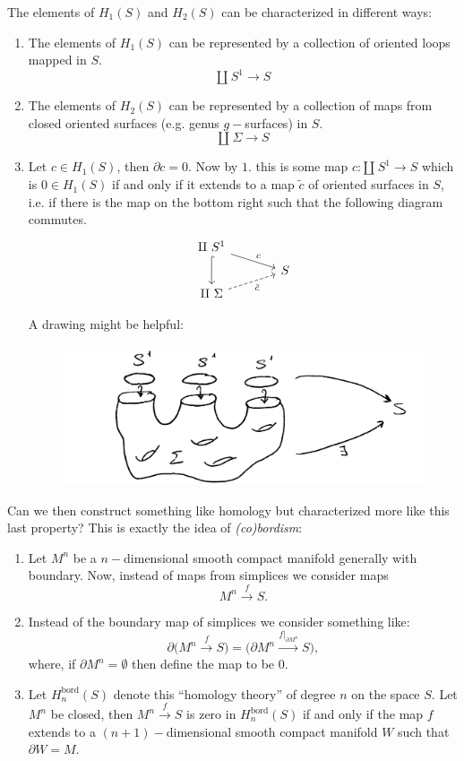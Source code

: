 The elements of $H_1(S)$ and $H_2(S)$ can be characterized in different ways:
\begin{enumerate}
    \item The elements of $H_1(S)$ can be represented by a collection of oriented loops mapped in $S$.
    $$\amalg \ S^1\longrightarrow S$$
    \item The elements of $H_2(S)$ can be represented by a collection of maps from closed oriented surfaces (e.g. genus $g-$surfaces) in $S$.
    $$\amalg \ \Sigma\longrightarrow S$$
    \item Let $c\in H_1(S)$, then $\partial c=0$. Now by $1.$ this is some map $c: \amalg \ S^1\to S$ which is $0 \in H_1(S)$ if and only if it extends to a map $\tilde c$ of oriented surfaces in $S$, i.e. if there is the map on the bottom right such that the following diagram commutes.
    $$
    \begin{tikzcd}[row sep=tiny, column sep=small]
      \amalg \ S^1 \ar[drrr, "c"] \ar[dd, hook]\\
                  &&&S \\
      \amalg \ \Sigma \ar[urrr, dashrightarrow, "\tilde c"']
    \end{tikzcd}
    $$
    
    A drawing might be helpful:
    \begin{figure}[!ht]
    \centering
    \includegraphics[width=11cm]{images/Lecture 1/extension.png}
    \end{figure}
\end{enumerate}
Can we then construct something like homology but characterized more like this last property?
This is exactly the idea of \textit{(co)bordism}:
\begin{enumerate}
    \item Let $M^n$ be a $n-$dimensional smooth compact manifold generally with boundary. Now, instead of maps from simplices we consider maps
    $$M^n\xrightarrow{f} S.$$
    \item Instead of the boundary map of simplices we consider something like:
    $$\partial\big(M^n\xrightarrow{f}S\big)=\big(\partial M^n\xrightarrow{f|_{\partial M^n}}S\big),$$
    where, if $\partial M^n=\emptyset$ then define the map to be $0$.
    \item Let $H^{\text{bord}}_n(S)$ denote this ``homology theory'' of degree $n$ on the space $S$. Let $M^n$ be closed, then $M^n\xrightarrow{f} S$ is zero in $H^{\text{bord}}_n(S)$ if and only if the map $f$ extends to a $(n+1)-$dimensional smooth compact manifold $W$ such that $\partial W= M$.
\end{enumerate}

